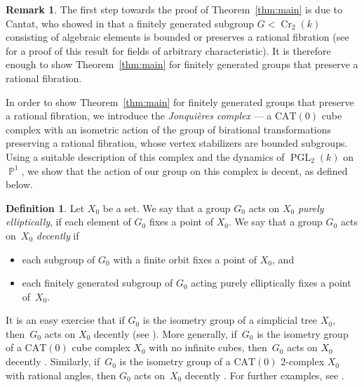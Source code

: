 \documentclass[11pt]{article}
\numberwithin{equation}{section}
\newcommand{\p}{\operatorname{\mathbb{P}}}\let\P\p
\newcommand{\Cr}{\operatorname{Cr}}
\newcommand{\PGL}{\operatorname{PGL}}
\theoremstyle{plain}
\theoremstyle{definition}
\newtheorem{definition}[theorem]{Definition}
\newtheorem{remark}[theorem]{Remark}
\begin{document}
\begin{remark}\label{rmk_redu_Cantat}
The first step towards the proof of Theorem~\ref{thm:main} is due to Cantat, who showed in \cite{Cantat_groupes_birat} that a finitely generated subgroup $G<\Cr_2(k)$ consisting of algebraic elements is bounded or preserves a rational fibration (see \cite{Lamy_Cremona} for a proof of this result for fields of arbitrary characteristic). It is therefore enough to show Theorem~\ref{thm:main} for finitely generated groups that preserve a rational fibration.
\end{remark}

{In order to show Theorem~\ref{thm:main} for finitely generated groups that preserve a rational fibration}, we introduce the \emph{Jonquières complex} --- a $\mathrm{CAT}(0)$ cube complex with an isometric action of the group of birational transformations preserving a rational fibra\-tion, whose vertex stabilizers are bounded subgroups. Using a suitable description of this complex and the dynamics of $\PGL_2(k)$ on $\p^1$, we show that the action of our group on this complex is decent, as defined below.

\begin{definition}
\label{def:decent}
Let $X_0$ be a set. We say that a group $G_0$ acts on $X_0$ \emph{purely elliptically}, if each element of $G_0$ fixes a point of $X_0$. We say that a group $G_0$ acts on~$X_0$ \emph{decently} if
\begin{itemize}
\item
each subgroup of $G_0$ with a finite orbit fixes a point of $X_0$, and
\item
each finitely generated subgroup of $G_0$ acting purely elliptically fixes a point of~$X_0$.
\end{itemize}
\end{definition}

It is an easy exercise
that if $G_0$ is the isometry group of a simplicial tree $X_0$, then~$G_0$ acts on $X_0$ decently {(see \cite[Cor.\,3 in \S6.5 \& Ex.\,6.3.4]{Serre})}. More generally, if~$G_0$ is the isometry group of a $\mathrm{CAT}(0)$ cube complex $X_0$ with no infinite cubes, then~$G_0$ acts on $X_0$ decently \cite{GLU_Neretin}. Similarly, if~$G_0$ is the isometry group of a $\mathrm{CAT}(0)$ $2$-complex $X_0$ with rational angles, then $G_0$ acts on~$X_0$ decently \cite{NOP}. For further examples, see \cite{HO}.
\end{document}
